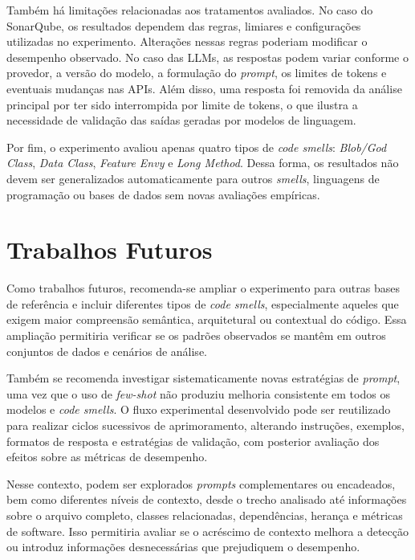 Também há limitações relacionadas aos tratamentos avaliados. No caso do SonarQube, os resultados dependem das regras, 
limiares e configurações utilizadas no experimento. Alterações nessas regras poderiam modificar o desempenho observado. 
No caso das LLMs, as respostas podem variar conforme o provedor, a versão do modelo, a formulação do \textit{prompt}, os limites 
de tokens e eventuais mudanças nas APIs. Além disso, uma resposta foi removida da análise principal por ter sido interrompida 
por limite de tokens, o que ilustra a necessidade de validação das saídas geradas por modelos de linguagem.

Por fim, o experimento avaliou apenas quatro tipos de \textit{code smells}: \textit{Blob/God Class}, \textit{Data Class}, \textit{Feature Envy} e \textit{Long Method}. 
Dessa forma, os resultados não devem ser generalizados automaticamente para outros \textit{smells}, linguagens de 
programação ou bases de dados sem novas avaliações empíricas.

\section{Trabalhos Futuros}

Como trabalhos futuros, recomenda-se ampliar o experimento para outras bases de referência e incluir diferentes tipos de \textit{code smells}, especialmente aqueles que exigem maior compreensão semântica, arquitetural ou contextual do código. Essa ampliação permitiria verificar se os padrões observados se mantêm em outros conjuntos de dados e cenários de análise.

Também se recomenda investigar sistematicamente novas estratégias de \textit{prompt}, uma vez que o uso de \textit{few-shot} não produziu melhoria consistente em todos os modelos e \textit{code smells}. O fluxo experimental desenvolvido pode ser reutilizado para realizar ciclos sucessivos de aprimoramento, alterando instruções, exemplos, formatos de resposta e estratégias de validação, com posterior avaliação dos efeitos sobre as métricas de desempenho.

Nesse contexto, podem ser explorados \textit{prompts} complementares ou encadeados, bem como diferentes níveis de contexto, desde o trecho analisado até informações sobre o arquivo completo, classes relacionadas, dependências, herança e métricas de software. Isso permitiria avaliar se o acréscimo de contexto melhora a detecção ou introduz informações desnecessárias que prejudiquem o desempenho.

